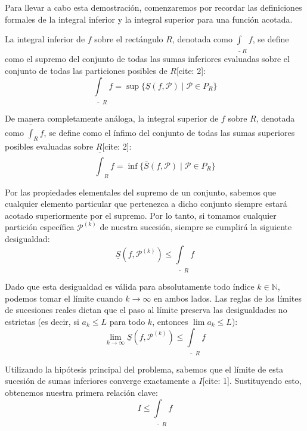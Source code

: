 \documentclass[11pt,letterpaper]{article}
\begin{document}
Para llevar a cabo esta demostración, comenzaremos por recordar las definiciones formales de la integral inferior y la integral superior para una función acotada. 

La integral inferior de $f$ sobre el rectángulo $R$, denotada como $\underline{\int}_{R}f$, se define como el supremo del conjunto de todas las sumas inferiores evaluadas sobre el conjunto de todas las particiones posibles de $R$[cite: 2]:
\begin{equation*}
\underline{\int}_{R}f = \sup \{\underline{S}(f,\mathcal{P}) \mid \mathcal{P} \in P_{R}\}
\end{equation*}

De manera completamente análoga, la integral superior de $f$ sobre $R$, denotada como $\overline{\int}_{R}f$, se define como el ínfimo del conjunto de todas las sumas superiores posibles evaluadas sobre $R$[cite: 2]:
\begin{equation*}
\overline{\int}_{R}f = \inf \{\overline{S}(f,\mathcal{P}) \mid \mathcal{P} \in P_{R}\}
\end{equation*}

Por las propiedades elementales del supremo de un conjunto, sabemos que cualquier elemento particular que pertenezca a dicho conjunto siempre estará acotado superiormente por el supremo. Por lo tanto, si tomamos cualquier partición específica $\mathcal{P}^{(k)}$ de nuestra sucesión, siempre se cumplirá la siguiente desigualdad:
\begin{equation*}
\underline{S}(f,\mathcal{P}^{(k)}) \le \underline{\int}_{R}f
\end{equation*}

Dado que esta desigualdad es válida para absolutamente todo índice $k \in \mathbb{N}$, podemos tomar el límite cuando $k \rightarrow \infty$ en ambos lados. Las reglas de los límites de sucesiones reales dictan que el paso al límite preserva las desigualdades no estrictas (es decir, si $a_{k} \le L$ para todo $k$, entonces $\lim a_{k} \le L$):
\begin{equation*}
\lim_{k\rightarrow\infty} \underline{S}(f,\mathcal{P}^{(k)}) \le \underline{\int}_{R}f
\end{equation*}

Utilizando la hipótesis principal del problema, sabemos que el límite de esta sucesión de sumas inferiores converge exactamente a $I$[cite: 1]. Sustituyendo esto, obtenemos nuestra primera relación clave:
\begin{equation*}
I \le \underline{\int}_{R}f
\end{equation*}
\end{document}
